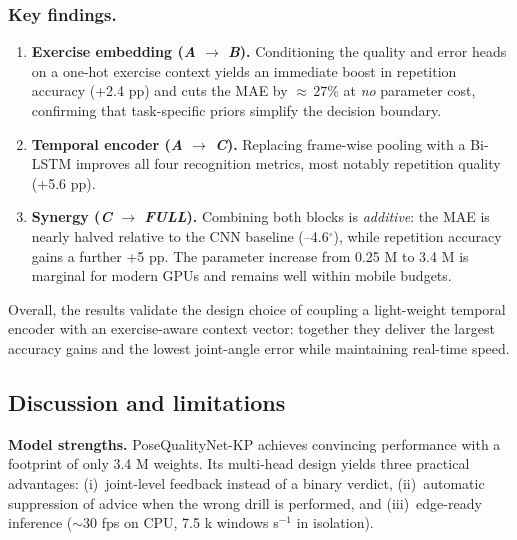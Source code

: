 \documentclass{article}
\begin{document}
\subsubsection{Key findings.}
\begin{enumerate}[leftmargin=1.35em,itemsep=2pt]
  \item \textbf{Exercise embedding (\textit{A} $\rightarrow$ \textit{B}).}
        Conditioning the quality and error heads on a one-hot exercise
        context yields an immediate boost in repetition accuracy
        (+2.4 pp) and cuts the MAE by \(\approx\,27\%\) at \emph{no}
        parameter cost, confirming that task-specific priors simplify
        the decision boundary.
  \item \textbf{Temporal encoder (\textit{A} $\rightarrow$ \textit{C}).}
        Replacing frame-wise pooling with a Bi-LSTM improves all four
        recognition metrics, most notably repetition quality
        (+5.6 pp).
  \item \textbf{Synergy (\textit{C} $\rightarrow$ \textit{FULL}).}
        Combining both blocks is \emph{additive}: the MAE is nearly
        halved relative to the CNN baseline (–4.6$^{\circ}$), while
        repetition accuracy gains a further +5 pp.  The parameter
        increase from 0.25 M to 3.4 M is marginal for modern GPUs and
        remains well within mobile budgets.
\end{enumerate}

Overall, the results validate the design choice of coupling a
light-weight temporal encoder with an exercise-aware context vector:
together they deliver the largest accuracy gains and the lowest
joint-angle error while maintaining real-time speed.


\subsection{Discussion and limitations}
\label{sec:limit}
\textbf{Model strengths.}  
PoseQualityNet-KP achieves convincing performance with a footprint of
only 3.4 M weights.  Its multi-head design yields three practical
advantages:  
(i)~joint-level feedback instead of a binary verdict,  
(ii)~automatic suppression of advice when the wrong drill is performed,
and  
(iii)~edge-ready inference (\(\sim\)30 fps on CPU, 7.5 k windows s\(^{-1}\)
in isolation).
\end{document}
